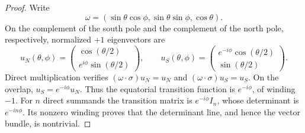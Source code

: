 \documentclass[11pt]{article}
\newcommand{\1}{I}
\begin{document}
\begin{proof}
Write
\[
 \omega=(\sin\theta\cos\phi,\sin\theta\sin\phi,\cos\theta).
\]
On the complement of the south pole and the complement of the north pole,
respectively, normalized $+1$ eigenvectors are
\[
 u_N(\theta,\phi)=
 \begin{pmatrix}\cos(\theta/2)\\ e^{i\phi}\sin(\theta/2)\end{pmatrix},
 \qquad
 u_S(\theta,\phi)=
 \begin{pmatrix}e^{-i\phi}\cos(\theta/2)\\ \sin(\theta/2)\end{pmatrix}.
\]
Direct multiplication verifies
$(\omega\cdot\sigma)u_N=u_N$ and
$(\omega\cdot\sigma)u_S=u_S$.  On the overlap,
$u_S=e^{-i\phi}u_N$.  Thus the equatorial transition function is
$e^{-i\phi}$, of winding $-1$.  For $n$ direct summands the transition matrix
is $e^{-i\phi}\1_n$, whose determinant is $e^{-in\phi}$.  Its nonzero
winding proves that the determinant line, and hence the vector bundle, is
nontrivial.
\end{proof}
\end{document}
